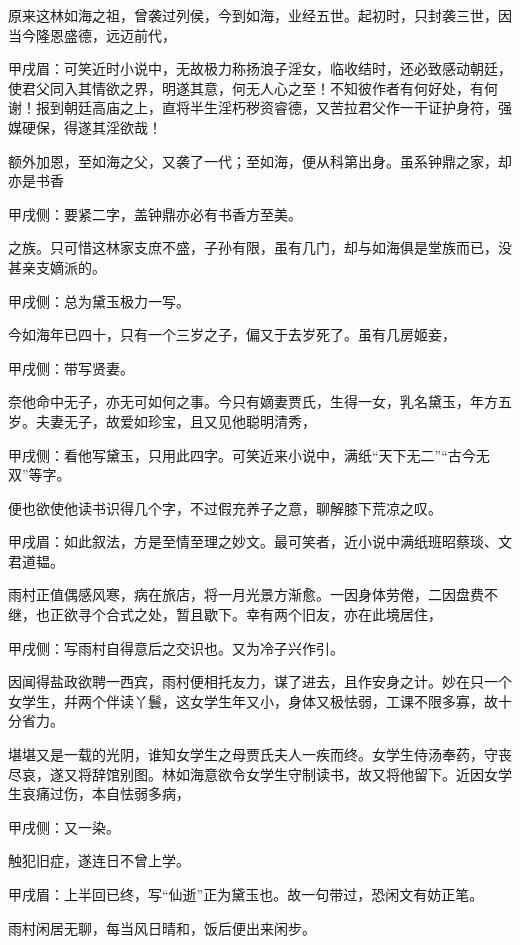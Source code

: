 \begin{parag}
    原来这林如海之祖，曾袭过列侯，今到如海，业经五世。起初时，只封袭三世，因当今隆恩盛德，远迈前代，\begin{note}甲戌眉：可笑近时小说中，无故极力称扬浪子淫女，临收结时，还必致感动朝廷，使君父同入其情欲之界，明遂其意，何无人心之至！不知彼作者有何好处，有何谢！报到朝廷高庙之上，直将半生淫朽秽资睿德，又苦拉君父作一干证护身符，强媒硬保，得遂其淫欲哉！\end{note}额外加恩，至如海之父，又袭了一代；至如海，便从科第出身。虽系钟鼎之家，却亦是书香\begin{note}甲戌侧：要紧二字，盖钟鼎亦必有书香方至美。\end{note}之族。只可惜这林家支庶不盛，子孙有限，虽有几门，却与如海俱是堂族而已，没甚亲支嫡派的。\begin{note}甲戌侧：总为黛玉极力一写。\end{note}今如海年已四十，只有一个三岁之子，偏又于去岁死了。虽有几房姬妾，\begin{note}甲戌侧：带写贤妻。\end{note}奈他命中无子，亦无可如何之事。今只有嫡妻贾氏，生得一女，乳名黛玉，年方五岁。夫妻无子，故爱如珍宝，且又见他聪明清秀，\begin{note}甲戌侧：看他写黛玉，只用此四字。可笑近来小说中，满纸“天下无二”“古今无双”等字。\end{note}便也欲使他读书识得几个字，不过假充养子之意，聊解膝下荒凉之叹。\begin{note}甲戌眉：如此叙法，方是至情至理之妙文。最可笑者，近小说中满纸班昭蔡琰、文君道韫。\end{note}
\end{parag}


\begin{parag}
    雨村正值偶感风寒，病在旅店，将一月光景方渐愈。一因身体劳倦，二因盘费不继，也正欲寻个合式之处，暂且歇下。幸有两个旧友，亦在此境居住，\begin{note}甲戌侧：写雨村自得意后之交识也。又为冷子兴作引。\end{note}因闻得盐政欲聘一西宾，雨村便相托友力，谋了进去，且作安身之计。妙在只一个女学生，幷两个伴读丫鬟，这女学生年又小，身体又极怯弱，工课不限多寡，故十分省力。
\end{parag}


\begin{parag}
    堪堪又是一载的光阴，谁知女学生之母贾氏夫人一疾而终。女学生侍汤奉药，守丧尽哀，遂又将辞馆别图。林如海意欲令女学生守制读书，故又将他留下。近因女学生哀痛过伤，本自怯弱多病，\begin{note}甲戌侧：又一染。\end{note}触犯旧症，遂连日不曾上学。\begin{note}甲戌眉：上半回已终，写“仙逝”正为黛玉也。故一句带过，恐闲文有妨正笔。\end{note}雨村闲居无聊，每当风日晴和，饭后便出来闲步。
\end{parag}


